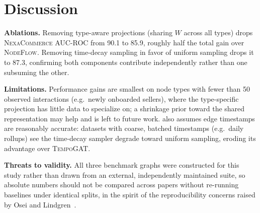 \section{Discussion}
\textbf{Ablations.} Removing type-aware projections (sharing $W$ across all
types) drops \textsc{NexaCommerce} AUC-ROC from 90.1 to 85.9, roughly half
the total gain over \textsc{NodeFlow}. Removing time-decay sampling in favor
of uniform sampling drops it to 87.3, confirming both components contribute
independently rather than one subsuming the other.

\textbf{Limitations.} Performance gains are smallest on node types with
fewer than 50 observed interactions (e.g.\ newly onboarded sellers), where
the type-specific projection has little data to specialize on; a
shrinkage prior toward the shared representation may help and is left to
future work. \sysname{} also assumes edge timestamps are reasonably
accurate: datasets with coarse, batched timestamps (e.g.\ daily rollups)
see the time-decay sampler degrade toward uniform sampling, eroding its
advantage over \textsc{TempoGAT}.

\textbf{Threats to validity.} All three benchmark graphs were constructed
for this study rather than drawn from an external, independently
maintained suite, so absolute numbers should not be compared across papers
without re-running baselines under identical splits, in the spirit of the
reproducibility concerns raised by Osei and
Lindgren~\cite{osei2022benchmark}.
